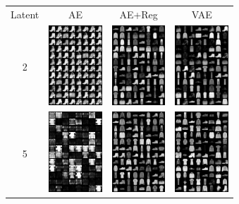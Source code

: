 \documentclass[conference]{IEEEtran}
\begin{document}
\begin{figure}[H]
        \centering
        \begin{tabular}{cccc}
		Latent & AE & AE+Reg & VAE \\[1mm]
		2&
                \includegraphics[width=2cm]{fig/fashion-2-false.png}&
		\includegraphics[width=2cm]{fig/fashion-2-true.png}&
                \includegraphics[width=2cm]{fig/fashion-2-vae.png}\\
                5&
                \includegraphics[width=2cm]{fig/fashion-5-false.png}&
		\includegraphics[width=2cm]{fig/fashion-5-true.png}&
                \includegraphics[width=2cm]{fig/fashion-5-vae.png}\\

\end{tabular}
\end{figure}
\end{document}
